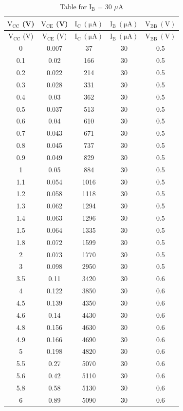 \documentclass[12pt]{article}
\begin{document}
\begin{longtable}[H]{|c|c|c|c|c|}
    \caption{Table for \( \mathrm{I_B}\) = 30 \( \mu \)A }
    \endfirsthead
    \hline
    $\mathrm{V_{CC}}$ (V) & $\mathrm{V_{CE}}$ (V) & $\mathrm{I_C \ (\mu A)}$ & $\mathrm{I_B \ (\mu A)}$ & $\mathrm{V_{BB} \ (V)}$ \\ \hline \hline
    \endhead 
    \hline
    $\mathrm{V_{CC}}$ (V) & $\mathrm{V_{CE}}$ (V) & $\mathrm{I_C \ (\mu A)}$ & $\mathrm{I_B \ (\mu A)}$ & $\mathrm{V_{BB} \ (V)}$ \\ \hline \hline
        0   & 0.007 & 37   & 30 & 0.5 \\ \hline
        0.1 & 0.02  & 166  & 30 & 0.5 \\ \hline
        0.2 & 0.022 & 214  & 30 & 0.5 \\ \hline
        0.3 & 0.028 & 331  & 30 & 0.5 \\ \hline
        0.4 & 0.03  & 362  & 30 & 0.5 \\ \hline
        0.5 & 0.037 & 513  & 30 & 0.5 \\ \hline
        0.6 & 0.04  & 610  & 30 & 0.5 \\ \hline
        0.7 & 0.043 & 671  & 30 & 0.5 \\ \hline
        0.8 & 0.045 & 737  & 30 & 0.5 \\ \hline
        0.9 & 0.049 & 829  & 30 & 0.5 \\ \hline
        1   & 0.05  & 884  & 30 & 0.5 \\ \hline
        1.1 & 0.054 & 1016 & 30 & 0.5 \\ \hline
        1.2 & 0.058 & 1118 & 30 & 0.5 \\ \hline
        1.3 & 0.062 & 1294 & 30 & 0.5 \\ \hline
        1.4 & 0.063 & 1296 & 30 & 0.5 \\ \hline
        1.5 & 0.064 & 1335 & 30 & 0.5 \\ \hline
        1.8 & 0.072 & 1599 & 30 & 0.5 \\ \hline
        2   & 0.073 & 1770 & 30 & 0.5 \\ \hline
        3   & 0.098 & 2950 & 30 & 0.5 \\ \hline
        3.5 & 0.11  & 3420 & 30 & 0.6 \\ \hline
        4   & 0.122 & 3850 & 30 & 0.6 \\ \hline
        4.5 & 0.139 & 4350 & 30 & 0.6 \\ \hline
        4.6 & 0.14  & 4430 & 30 & 0.6 \\ \hline
        4.8 & 0.156 & 4630 & 30 & 0.6 \\ \hline
        4.9 & 0.166 & 4690 & 30 & 0.6 \\ \hline
        5   & 0.198 & 4820 & 30 & 0.6 \\ \hline
        5.5 & 0.27  & 5070 & 30 & 0.6 \\ \hline
        5.6 & 0.42  & 5110 & 30 & 0.6 \\ \hline
        5.8 & 0.58  & 5130 & 30 & 0.6 \\ \hline
        6   & 0.89  & 5090 & 30 & 0.6 \\ \hline
\end{longtable}
\end{document}

